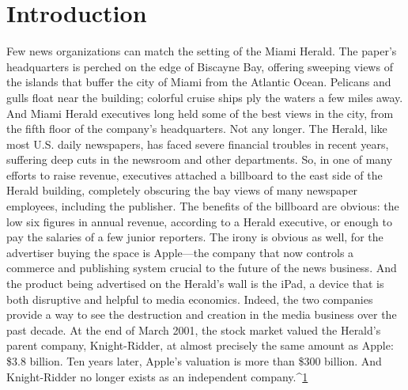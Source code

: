 \chapter{Introduction}
Few news organizations can match the setting of the Miami Herald. The paper’s
headquarters is perched on the edge of Biscayne Bay, offering sweeping views of
the islands that buffer the city of Miami from the Atlantic Ocean. Pelicans and
gulls float near the building; colorful cruise ships ply the waters a few miles away.
And Miami Herald executives long held some of the best views in the city,
from the fifth floor of the company’s headquarters.
Not any longer.
The Herald, like most U.S. daily newspapers, has faced severe financial troubles
in recent years, suffering deep cuts in the newsroom and other departments. So,
in one of many efforts to raise revenue, executives attached a billboard to the east
side of the Herald building, completely obscuring the bay views of many newspaper
employees, including the publisher.
The benefits of the billboard are obvious: the low six figures in annual revenue,
according to a Herald executive, or enough to pay the salaries of a few
junior reporters.
The irony is obvious as well, for the advertiser buying the space is Apple—the
company that now controls a commerce and publishing system crucial to the
future of the news business. And the product being advertised on the Herald’s
wall is the iPad, a device that is both disruptive and helpful to media economics.
Indeed, the two companies provide a way to see the destruction and creation
in the media business over the past decade. At the end of March 2001, the stock
market valued the Herald’s parent company, Knight-Ridder, at almost precisely
the same amount as Apple: \$3.8 billion.
Ten years later, Apple’s valuation is more than \$300 billion. And Knight-Ridder
no longer exists as an independent company.^{\href{#endnotes-intro}{1}}%

